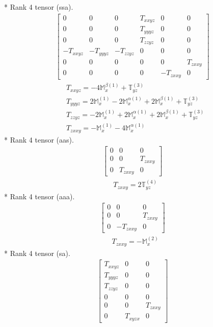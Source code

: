 \documentclass[fleqn,8pt,landscape]{jsarticle}
\begin{document}
* Rank 4 tensor (ssa).
\begin{align*}
\begin{bmatrix} 0 & 0 & 0 & T_{xxyz} & 0 & 0 \\ 0 & 0 & 0 & T_{yyyz} & 0 & 0 \\ 0 & 0 & 0 & T_{zzyz} & 0 & 0 \\ - T_{xxyz} & - T_{yyyz} & - T_{zzyz} & 0 & 0 & 0 \\ 0 & 0 & 0 & 0 & 0 & T_{zxxy} \\ 0 & 0 & 0 & 0 & - T_{zxxy} & 0 \end{bmatrix}
\end{align*}
\begin{align*}
& T_{xxyz} = - 4 \mathbb{M}_{x}^{\beta(1)} + \mathbb{T}_{yz}^{(3)} \\
& T_{yyyz} = 2 \mathbb{M}_{x}^{(1)} - 2 \mathbb{M}_{x}^{\alpha(1)} + 2 \mathbb{M}_{x}^{\beta(1)} + \mathbb{T}_{yz}^{(3)} \\
& T_{zzyz} = - 2 \mathbb{M}_{x}^{(1)} + 2 \mathbb{M}_{x}^{\alpha(1)} + 2 \mathbb{M}_{x}^{\beta(1)} + \mathbb{T}_{yz}^{(3)} \\
& T_{zxxy} = - \mathbb{M}_{x}^{(1)} - 4 \mathbb{M}_{x}^{\alpha(1)}
\end{align*}
* Rank 4 tensor (aas).
\begin{align*}
\begin{bmatrix} 0 & 0 & 0 \\ 0 & 0 & T_{zxxy} \\ 0 & T_{zxxy} & 0 \end{bmatrix}
\end{align*}
\begin{align*}
& T_{zxxy} = 2 \mathbb{T}_{yz}^{(4)}
\end{align*}
* Rank 4 tensor (aaa).
\begin{align*}
\begin{bmatrix} 0 & 0 & 0 \\ 0 & 0 & T_{zxxy} \\ 0 & - T_{zxxy} & 0 \end{bmatrix}
\end{align*}
\begin{align*}
& T_{zxxy} = - \mathbb{M}_{x}^{(2)}
\end{align*}
* Rank 4 tensor (sa).
\begin{align*}
\begin{bmatrix} T_{xxyz} & 0 & 0 \\ T_{yyyz} & 0 & 0 \\ T_{zzyz} & 0 & 0 \\ 0 & 0 & 0 \\ 0 & 0 & T_{zxxy} \\ 0 & T_{xyzx} & 0 \end{bmatrix}
\end{align*}
\end{document}
